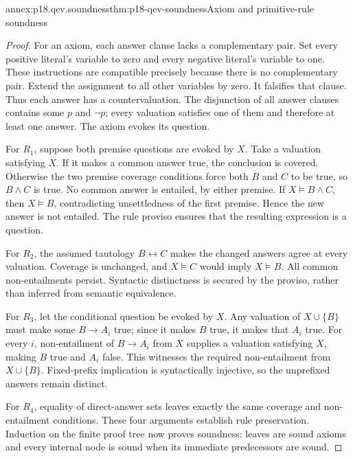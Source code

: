 \begin{annexitem}{annex:p18.qev.soundness}{thm:p18-qev-soundness}{Axiom and primitive-rule soundness}
\begin{proof}
For an axiom, each answer clause lacks a complementary pair. Set every
positive literal's variable to zero and every negative literal's
variable to one. These instructions are compatible precisely because
there is no complementary pair. Extend the assignment to all other
variables by zero. It falsifies that clause. Thus each answer has a
countervaluation. The disjunction of all answer clauses contains some
\(p\) and \(\neg p\); every valuation satisfies one of them and
therefore at least one answer. The axiom evokes its question.

For \(R_1\), suppose both premise questions are evoked by \(X\).
Take a valuation satisfying \(X\). If it makes a common answer true,
the conclusion is covered. Otherwise the two premise coverage
conditions force both \(B\) and \(C\) to be true, so \(B\land C\)
is true. No common answer is entailed, by either premise. If
\(X\models B\land C\), then \(X\models B\), contradicting
unsettledness of the first premise. Hence the new answer is not entailed.
The rule proviso ensures that the resulting expression is a question.

For \(R_2\), the assumed tautology \(B\leftrightarrow C\)
makes the changed answers agree at every valuation. Coverage is
unchanged, and \(X\models C\) would imply \(X\models B\).
All common non-entailments persist. Syntactic distinctness is secured
by the proviso, rather than inferred from semantic equivalence.

For \(R_3\), let the conditional question be evoked by \(X\).
Any valuation of \(X\cup\{B\}\) must make some \(B\to A_i\)
true; since it makes \(B\) true, it makes that \(A_i\) true.
For every \(i\), non-entailment of \(B\to A_i\) from \(X\)
supplies a valuation satisfying \(X\), making \(B\) true and
\(A_i\) false. This witnesses the required non-entailment from
\(X\cup\{B\}\). Fixed-prefix implication is syntactically
injective, so the unprefixed answers remain distinct.

For \(R_4\), equality of direct-answer sets leaves exactly the same
coverage and non-entailment conditions. These four arguments establish
rule preservation. Induction on the finite proof tree now proves
soundness: leaves are sound axioms and every internal node is sound
when its immediate predecessors are sound.
\end{proof}
\end{annexitem}

